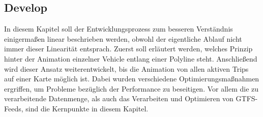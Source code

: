 \begin{newpage}
  \section{Develop}
  \label{sec:develop}

    In diesem Kapitel soll der Entwicklungsprozess zum besseren Verständnis einigermaßen linear beschrieben werden, obwohl der eigentliche Ablauf nicht immer dieser Linearität entsprach. Zuerst soll erläutert werden, welches Prinzip hinter der Animation einzelner Vehicle entlang einer Polyline steht. Anschließend wird dieser Ansatz weiterentwickelt, bis die Animation von allen aktiven Trips auf einer Karte möglich ist. Dabei wurden verschiedene Optimierungsmaßnahmen ergriffen, um Probleme bezüglich der Performance zu beseitigen. Vor allem die zu verarbeitende Datenmenge, als auch das Verarbeiten und Optimieren von GTFS-Feeds, sind die Kernpunkte in diesem Kapitel. 

    
    
    
    
    
    

\end{newpage}